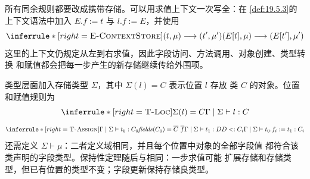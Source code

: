 \begin{taplsolutionentrybox}
所有同余规则都要改成携带存储。可以用求值上下文一次写全：在
\cref{def:19.5.3}的上下文语法中加入
\(E.f:=t\) 与 \(l.f:=E\)，并使用
\[
\inferrule*[right=\textsc{E-ContextStore}]
 {(t,\mu)\trans(t',\mu')}
 {(E[t],\mu)\trans(E[t'],\mu')}
\]
这里的上下文仍规定从左到右求值，因此字段访问、方法调用、对象创建、类型转换
和赋值都会把每一步产生的新存储继续传给外围项。

类型层面加入存储类型 \(\Sigma\)，其中 \(\Sigma(l)=C\) 表示位置 \(l\) 存放
类 \(C\) 的对象。位置和赋值规则为
\[
\inferrule*[right=\textsc{T-Loc}]
 {\Sigma(l)=C}{\Gamma\mid\Sigma\vdash l:C}
\]
\[
\inferrule*[right=\textsc{T-Assign}]
 {\Gamma\mid\Sigma\vdash t_0:C_0\\
  \mathit{fields}(C_0)=\overline C\ \overline f\\
  \Gamma\mid\Sigma\vdash t_1:D\\
  D\subtype C_i}
 {\Gamma\mid\Sigma\vdash t_0.f_i:=t_1:C_i}
\]
还需定义 \(\Sigma\vdash\mu\)：二者定义域相同，并且每个位置中对象的全部字段值
都符合该类声明的字段类型。保持性定理随后与相同：一步求值可能
扩展存储和存储类型，但已有位置的类型不变；字段更新保持存储良类型。

\end{taplsolutionentrybox}

